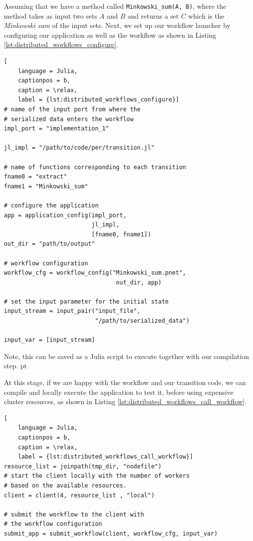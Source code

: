 \documentclass{juliacon}
\begin{document}
Assuming that we have a method called \verb+Minkowski_sum(A, B)+, where the method takes as input two sets $A$ and $B$ and returns a set $C$ which is the \emph{Minkowski sum} of the input sets.
Next, we set up our workflow launcher by configuring our application as well as the workflow as shown in Listing \ref{lst:distributed_workflows_configure}.

\begin{lstlisting}[
    language = Julia,
    captionpos = b,
    caption = \relax,
    label = {lst:distributed_workflows_configure}]
# name of the input port from where the 
# serialized data enters the workflow
impl_port = "implementation_1"

jl_impl = "/path/to/code/per/transition.jl"

# name of functions corresponding to each transition
fname0 = "extract"
fname1 = "Minkowski_sum"

# configure the application
app = application_config(impl_port, 
                         jl_impl, 
                         [fname0, fname1])
out_dir = "path/to/output"

# workflow configuration 
workflow_cfg = workflow_config("Minkowski_sum.pnet", 
                                out_dir, app)

# set the input parameter for the initial state
input_stream = input_pair("input_file", 
                          "/path/to/serialized_data")

input_var = [input_stream]
\end{lstlisting}

Note, this can be saved as a Julia script to execute together with our compilation step. pt

At this stage, if we are happy with the workflow and our transition code, we can compile and locally execute the application to test it, before using expensive cluster resources, as shown in Listing \ref{lst:distributed_workflows_call_workflow}.

\begin{lstlisting}[
    language = Julia,
    captionpos = b,
    caption = \relax,
    label = {lst:distributed_workflows_call_workflow}]
resource_list = joinpath(tmp_dir, "nodefile")
# start the client locally with the number of workers 
# based on the available resources.
client = client(4, resource_list , "local")

# submit the workflow to the client with 
# the workflow configuration
submit_app = submit_workflow(client, workflow_cfg, input_var)
\end{lstlisting}
\end{document}
